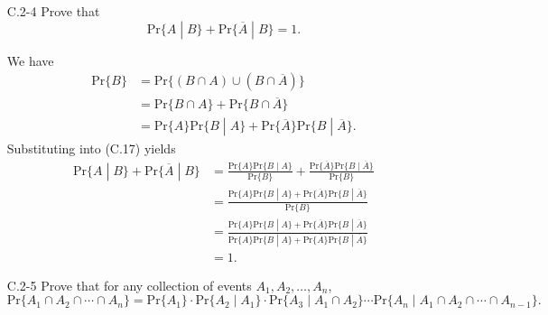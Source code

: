 \begin{enumerate}
\item[C.2{-}4] {Prove that
\[
  \text{Pr}\{A\;|\;B\} + \text{Pr}\{\overline{A}\;|\;B\} = 1.
\]
}

\begin{framed}
We have
\begin{equation*}
\begin{aligned}
  \text{Pr}\{B\} &= \text{Pr}\{(B \cap A) \cup (B \cap \overline{A})\}\\
                 &= \text{Pr}\{B \cap A\} + \text{Pr}\{B \cap \overline{A}\}\\
                 &= \text{Pr}\{A\} \text{Pr}\{B\;|\;A\} + \text{Pr}\{\overline{A}\} \text{Pr}\{B\;|\;\overline{A}\}.
\end{aligned}
\end{equation*}
Substituting into (C.17) yields
\begin{equation*}
\begin{aligned}
  \text{Pr}\{A\;|\;B\} + \text{Pr}\{\overline{A}\;|\;B\}
  &= \frac{\text{Pr}\{A\} \text{Pr}\{B\;|\;A\}}{\text{Pr}\{B\}} +
     \frac{\text{Pr}\{\overline{A}\} \text{Pr}\{B\;|\;\overline{A}\}}{\text{Pr}\{B\}}\\
  &= \frac{\text{Pr}\{A\} \text{Pr}\{B\;|\;A\} + \text{Pr}\{\overline{A}\} \text{Pr}\{B\;|\;\overline{A}\}}
          {\text{Pr}\{B\}}\\
  &= \frac{\text{Pr}\{A\} \text{Pr}\{B\;|\;A\} + \text{Pr}\{\overline{A}\} \text{Pr}\{B\;|\;\overline{A}\}}
          {\text{Pr}\{A\} \text{Pr}\{B\;|\;A\} + \text{Pr}\{\overline{A}\} \text{Pr}\{B\;|\;\overline{A}\}}\\
  &= 1.
\end{aligned}
\end{equation*}

\end{framed}

\item[C.2{-}5] {Prove that for any collection of events $A_1, A_2, \dots, A_n$,
\[
  \text{Pr}\{A_1 \cap A_2 \cap \cdots \cap A_n\} =
    \text{Pr}\{A_1\} \cdot \text{Pr}\{A_2\;|\;A_1\} \cdot \text{Pr}\{A_3\;|\;A_1 \cap A_2\} \cdots
    \text{Pr}\{A_n\;|\;A_1 \cap A_2 \cap \cdots \cap A_{n - 1}\}.
\]
}


\end{enumerate}
